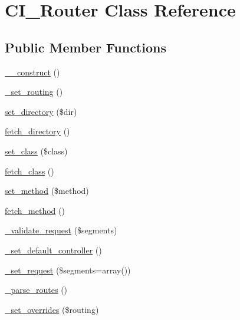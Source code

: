 \hypertarget{class_c_i___router}{}\section{C\+I\+\_\+\+Router Class Reference}
\label{class_c_i___router}
\subsection*{Public Member Functions}
\begin{DoxyCompactItemize}
\item 
\hyperlink{class_c_i___router_a095c5d389db211932136b53f25f39685}{\+\_\+\+\_\+construct} ()
\item 
\hyperlink{class_c_i___router_abc9f3e0d48cec66f93a7f103c9a65892}{\+\_\+set\+\_\+routing} ()
\item 
\hyperlink{class_c_i___router_aba98bd014f2bd0e2b299bd7a0695b33e}{set\+\_\+directory} (\$dir)
\item 
\hyperlink{class_c_i___router_a7a089f2cfae731dcc9e59a71d20208ef}{fetch\+\_\+directory} ()
\item 
\hyperlink{class_c_i___router_afbb540df5c161fe69909a5f8182f910f}{set\+\_\+class} (\$class)
\item 
\hyperlink{class_c_i___router_af5586c3f514021e9e2588e102620d237}{fetch\+\_\+class} ()
\item 
\hyperlink{class_c_i___router_a6a42036a115946acdaf0975c994106fb}{set\+\_\+method} (\$method)
\item 
\hyperlink{class_c_i___router_ad408b28e3a095e7435f21e95d93e7714}{fetch\+\_\+method} ()
\item 
\hyperlink{class_c_i___router_a488aa4aaa52c36c4e6c791e7bfd76358}{\+\_\+validate\+\_\+request} (\$segments)
\item 
\hyperlink{class_c_i___router_a86b13067b062022251d2c7ecb4fb9492}{\+\_\+set\+\_\+default\+\_\+controller} ()
\item 
\hyperlink{class_c_i___router_a92b8b486926e4dea5fee4d71f80a472a}{\+\_\+set\+\_\+request} (\$segments=array())
\item 
\hyperlink{class_c_i___router_a55a42fae865d03334b49baa5a5a6bd0b}{\+\_\+parse\+\_\+routes} ()
\item 
\hyperlink{class_c_i___router_a43442c6087205cb04125a4953b045d87}{\+\_\+set\+\_\+overrides} (\$routing)
\end{DoxyCompactItemize}
